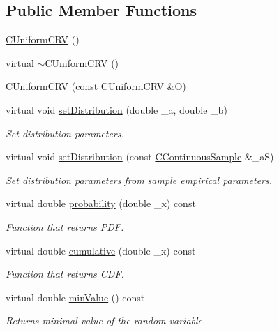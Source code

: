 \subsection*{Public Member Functions}
\begin{DoxyCompactItemize}
\item 
\hyperlink{class_c_uniform_c_r_v_a318b7f3cd1b39bc41476c1f237052aa3}{C\-Uniform\-C\-R\-V} ()
\item 
virtual \hyperlink{class_c_uniform_c_r_v_a934e5d815a002914f3a3d5d9bd22e024}{$\sim$\-C\-Uniform\-C\-R\-V} ()
\item 
\hyperlink{class_c_uniform_c_r_v_a819042dccddba50cc2d2f754149d0104}{C\-Uniform\-C\-R\-V} (const \hyperlink{class_c_uniform_c_r_v}{C\-Uniform\-C\-R\-V} \&O)
\item 
virtual void \hyperlink{class_c_uniform_c_r_v_a30823edf291d2e574281cfbb68a33196}{set\-Distribution} (double \-\_\-a, double \-\_\-b)
\begin{DoxyCompactList}\small\item\em Set distribution parameters. \end{DoxyCompactList}\item 
virtual void \hyperlink{class_c_uniform_c_r_v_a302ede9d381353a5d338dd6fcbe337a4}{set\-Distribution} (const \hyperlink{class_c_continuous_sample}{C\-Continuous\-Sample} \&\-\_\-a\-S)
\begin{DoxyCompactList}\small\item\em Set distribution parameters from sample empirical parameters. \end{DoxyCompactList}\item 
virtual double \hyperlink{class_c_uniform_c_r_v_ae066ca01cbc708f8a8b6fc9601e8e3a4}{probability} (double \-\_\-x) const 
\begin{DoxyCompactList}\small\item\em Function that returns P\-D\-F. \end{DoxyCompactList}\item 
virtual double \hyperlink{class_c_uniform_c_r_v_afaccc6fb38175137056624921c994be7}{cumulative} (double \-\_\-x) const 
\begin{DoxyCompactList}\small\item\em Function that returns C\-D\-F. \end{DoxyCompactList}\item 
virtual double \hyperlink{class_c_uniform_c_r_v_ad12fcdb36f46472c2115fa02e0527af4}{min\-Value} () const 
\begin{DoxyCompactList}\small\item\em Returns minimal value of the random variable. \end{DoxyCompactList}\item 

\end{DoxyCompactItemize}

